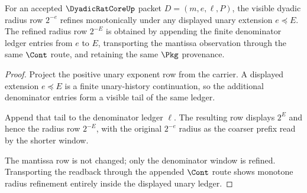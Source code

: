 \begin{theorem}
\label{thm:dyadicratcore-monotone-radius-obligation}
For an accepted $\DyadicRatCoreUp$ packet $D=(m,e,\ell,P)$, the visible
dyadic radius row $2^{-e}$ refines monotonically under any displayed unary
extension $e \preceq E$. The refined radius row $2^{-E}$ is obtained by
appending the finite denominator ledger entries from $e$ to $E$, transporting
the mantissa observation through the same $\Cont$ route, and retaining the
same $\Pkg$ provenance.
\end{theorem}
\begin{proof}
Project the positive unary exponent row from the carrier. A displayed
extension $e \preceq E$ is a finite unary-history continuation, so the
additional denominator entries form a visible tail of the same ledger.

Append that tail to the denominator ledger $\ell$. The resulting row displays
$2^E$ and hence the radius row $2^{-E}$, with the original $2^{-e}$ radius as
the coarser prefix read by the shorter window.

The mantissa row is not changed; only the denominator window is refined.
Transporting the readback through the appended $\Cont$ route shows monotone
radius refinement entirely inside the displayed unary ledger.
\end{proof}

